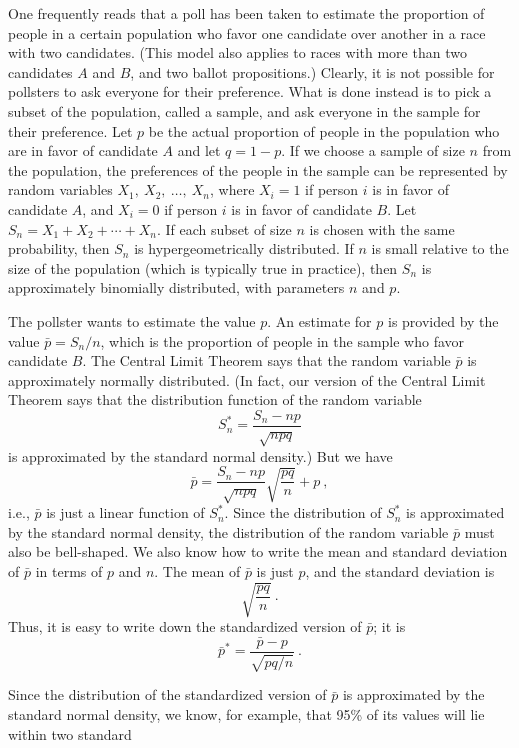 \begin{example}\label{exam 9.4.1}
One frequently reads that a poll has been taken to estimate the proportion of people
in a certain population who favor one candidate over another in a race with two candidates. 
(This model also applies to races with more than two candidates $A$ and $B$, and two ballot
propositions.)  Clearly, it is not possible for pollsters to ask everyone for their preference. 
What is done instead is to pick a subset of the population, called a sample, and ask
everyone in the sample for their preference.  Let $p$ be the actual proportion of people in the
population who are in favor of candidate $A$ and let $q = 1-p$.  If we choose a sample of size $n$
from the population, the preferences of the people in the sample can be represented by random
variables $X_1,\ X_2,\ \ldots,\ X_n$, where $X_i = 1$ if person $i$ is in favor of candidate $A$,
and $X_i = 0$ if person $i$ is in favor of candidate $B$.  Let $S_n = X_1 + X_2 + \cdots + X_n$. 
If each subset of size $n$ is chosen with the same probability, then $S_n$ is hypergeometrically
distributed.  If $n$ is small relative to the size of the population (which is typically true in
practice), then $S_n$ is approximately binomially distributed, with parameters $n$ and $p$.
\par
The pollster wants to estimate the value $p$.  An estimate for $p$ is provided by the value
$\bar p = S_n/n$, which is the proportion of people in the sample who favor candidate $B$.
The Central Limit Theorem says that the random variable $\bar p$ is approximately normally
distributed.  (In fact, our version of the Central Limit Theorem says that the distribution
function of the random variable
$$S_n^* = \frac{S_n - np}{\sqrt{npq}}$$
is approximated by the standard normal density.)  But we have
$$\bar p = \frac{S_n - np}{\sqrt {npq}}\sqrt{\frac{pq}{n}}+p\ ,$$
i.e., $\bar p$ is just a linear function of $S_n^*$.  Since the distribution of $S_n^*$ is
approximated by the standard normal density, the distribution of the random variable $\bar p$
must also be bell-shaped.  We also know how to write the mean and standard deviation of $\bar p$
in terms of
$p$ and
$n$.  The mean of $\bar p$ is just $p$, and the standard deviation is
$$\sqrt{\frac{pq}{n}}\ .$$
Thus, it is easy to write down the standardized version of $\bar p$; it is
$$\bar p^* = \frac{\bar p - p}{\sqrt{pq/n}}\ .$$
\par
Since the distribution of the standardized version of $\bar p$ is approximated by the standard
normal density, we know, for example, that 95\% of its values will lie within two standard

\end{example}
